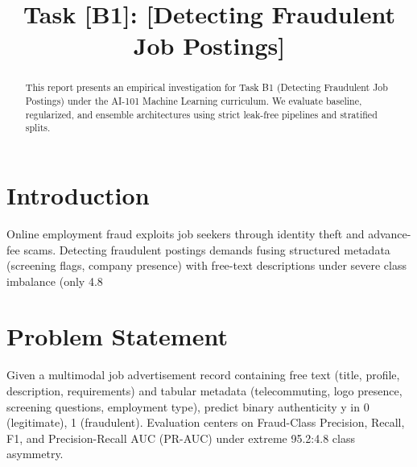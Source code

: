 \documentclass[conference]{IEEEtran}
\begin{document}
\title{Task [B1]: [Detecting Fraudulent Job Postings]}

\author{
}

\maketitle

\begin{abstract}
This report presents an empirical investigation for Task B1 (Detecting Fraudulent Job Postings) under the AI-101 Machine Learning curriculum. We evaluate baseline, regularized, and ensemble architectures using strict leak-free pipelines and stratified splits.
\end{abstract}

\section{Introduction}
Online employment fraud exploits job seekers through identity theft and advance-fee scams. Detecting fraudulent postings demands fusing structured metadata (screening flags, company presence) with free-text descriptions under severe class imbalance (only 4.8%

\section{Problem Statement}
Given a multimodal job advertisement record containing free text (title, profile, description, requirements) and tabular metadata (telecommuting, logo presence, screening questions, employment type), predict binary authenticity y in {0 (legitimate), 1 (fraudulent)}. Evaluation centers on Fraud-Class Precision, Recall, F1, and Precision-Recall AUC (PR-AUC) under extreme 95.2:4.8 class asymmetry.
\end{document}
